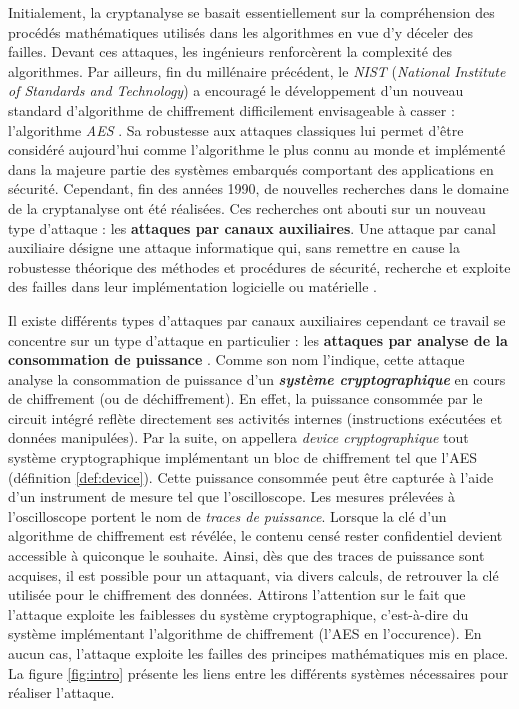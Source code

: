 \documentclass[oneside]{book}
\begin{document}
Initialement, la cryptanalyse se basait essentiellement sur la compréhension des procédés mathématiques utilisés dans les algorithmes en vue d'y déceler des failles. Devant ces attaques, les ingénieurs renforcèrent la complexité des algorithmes. Par ailleurs, fin du millénaire précédent, le \textit{NIST} (\textit{National Institute of Standards and Technology}) a encouragé le développement d’un nouveau standard d’algorithme de chiffrement difficilement envisageable à casser : l’algorithme \textit{AES} \cite{noauthor_fips_nodate}. Sa robustesse aux attaques classiques lui permet d'être considéré aujourd’hui comme l'algorithme le plus connu au monde et implémenté dans la majeure partie des systèmes embarqués comportant des applications en sécurité. Cependant, fin des années 1990, de nouvelles recherches dans le domaine de la cryptanalyse ont été réalisées. Ces recherches ont abouti sur un nouveau type d'attaque : les \textbf{attaques par canaux auxiliaires}. Une attaque par canal auxiliaire désigne une attaque informatique qui, sans remettre en cause la robustesse théorique des méthodes et procédures de sécurité, recherche et exploite des failles dans leur implémentation logicielle ou matérielle \cite{noauthor_attaque_2018}. 

\newpage
Il existe différents types d'attaques par canaux auxiliaires cependant ce travail se concentre sur un type d'attaque en particulier : les \textbf{attaques par analyse de la consommation de puissance} \cite{mangard_power_2007}. Comme son nom l'indique, cette attaque analyse la consommation de puissance d'un \textbf{\textit{système cryptographique}} en cours de chiffrement (ou de déchiffrement). En effet, la puissance consommée par le circuit intégré reflète directement ses activités internes (instructions exécutées et données manipulées). Par la suite, on appellera \textit{device cryptographique} tout système cryptographique implémentant un bloc de chiffrement tel que l'AES (définition \ref{def:device}). Cette puissance consommée peut être capturée à l'aide d'un instrument de mesure tel que l'oscilloscope. Les mesures prélevées à l'oscilloscope portent le nom de \textit{traces de puissance}. Lorsque la clé d'un algorithme de chiffrement est révélée, le contenu censé rester confidentiel devient accessible à quiconque le souhaite. Ainsi, dès que des traces de puissance sont acquises, il est possible pour un attaquant, via divers calculs, de retrouver la clé utilisée pour le chiffrement des données. Attirons l'attention sur le fait que l'attaque exploite les faiblesses du système cryptographique, c'est-à-dire du système implémentant l'algorithme de chiffrement (l'AES en l'occurence). En aucun cas, l'attaque exploite les failles des principes mathématiques mis en place. La figure \ref{fig:intro} présente les liens entre les différents systèmes nécessaires pour réaliser l'attaque.
\end{document}
